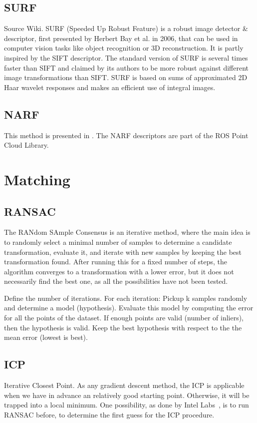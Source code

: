 \documentclass[a4paper,11pt]{kth-mag}
\begin{document}
\subsection{SURF}
Source Wiki.
SURF (Speeded Up Robust Feature) is a robust image detector \& descriptor, first presented by Herbert Bay et al. in 2006, that can be used in computer vision tasks like object recognition or 3D reconstruction. It is partly inspired by the SIFT descriptor. The standard version of SURF is several times faster than SIFT and claimed by its authors to be more robust against different image transformations than SIFT. SURF is based on sums of approximated 2D Haar wavelet responses and makes an efficient use of integral images.

\subsection{NARF}
This method is presented in \cite{steder10irosws}. The NARF descriptors are part of the ROS Point Cloud Library.

\section{Matching}

\subsection{RANSAC}
The RANdom SAmple Consensus is an iterative method, where the main idea is to randomly select a minimal number of samples to determine a candidate transformation, evaluate it, and iterate with new samples by keeping the best transformation found. After running this for a fixed number of steps, the algorithm converges to a transformation with a lower error, but it does not necessarily find the best one, as all the possibilities have not been tested.

Define the number of iterations.
For each iteration:
Pickup k samples randomly and determine a model (hypothesis). Evaluate this model by computing the error for all the points of the dataset. If enough points are valid (number of inliers), then the hypothesis is valid. Keep the best hypothesis with respect to the the mean error (lowest is best).

\subsection{ICP}
Iterative Closest Point. As any gradient descent method, the ICP is applicable when we have in advance an relatively good starting point. Otherwise, it will be trapped into a local minimum. One possibility, as done by Intel Labs~\cite{IntelRGBD2010}, is to run RANSAC before, to determine the first guess for the ICP procedure.
\end{document}
